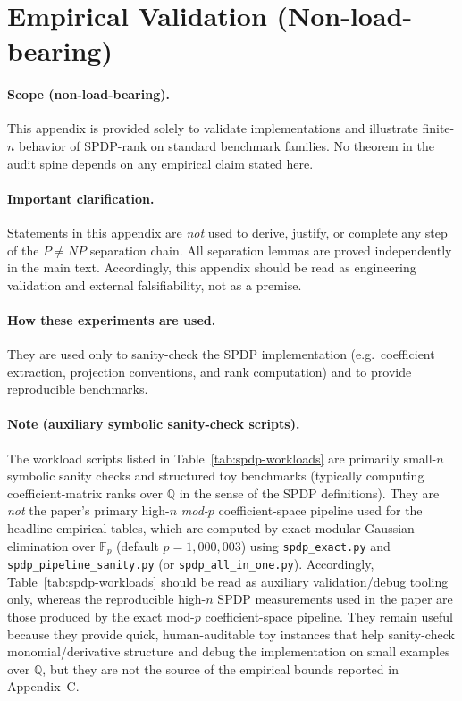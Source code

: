 \documentclass[12pt]{article}
\theoremstyle{definition}
\theoremstyle{definition}
\theoremstyle{remark}
\theoremstyle{remark}
\begin{document}
\section{Empirical Validation (Non-load-bearing)}
\label{sec:empirical}
\label{app:empirical-validation}
\FloatBarrier  %

\paragraph{Scope (non-load-bearing).}
This appendix is provided solely to validate implementations and illustrate finite-$n$
behavior of SPDP-rank on standard benchmark families. No theorem in the audit spine
depends on any empirical claim stated here.

\paragraph{Important clarification.}
Statements in this appendix are \emph{not} used to derive, justify, or complete any step of the
$P\neq NP$ separation chain. All separation lemmas are proved independently in the main text.
Accordingly, this appendix should be read as engineering validation and external falsifiability,
not as a premise.

\paragraph{How these experiments are used.}
They are used only to sanity-check the SPDP implementation (e.g.\ coefficient extraction,
projection conventions, and rank computation) and to provide reproducible benchmarks.

\paragraph{Note (auxiliary symbolic sanity-check scripts).}
The workload scripts listed in Table~\ref{tab:spdp-workloads} are primarily small-$n$ symbolic
sanity checks and structured toy benchmarks (typically computing coefficient-matrix ranks over
$\mathbb{Q}$ in the sense of the SPDP definitions). They are \emph{not} the paper's primary
high-$n$ \emph{mod-$p$} coefficient-space pipeline used for the headline empirical tables, which
are computed by exact modular Gaussian elimination over $\mathbb{F}_p$ (default $p=1{,}000{,}003$)
using \texttt{spdp\_exact.py} and \texttt{spdp\_pipeline\_sanity.py} (or \texttt{spdp\_all\_in\_one.py}).
Accordingly, Table~\ref{tab:spdp-workloads} should be read as auxiliary validation/debug tooling only, whereas the reproducible high-$n$ SPDP measurements used in the paper are those produced by the exact mod-$p$ coefficient-space pipeline.
They remain useful because they provide quick, human-auditable toy instances that help sanity-check monomial/derivative structure and debug the implementation on small examples over $\mathbb{Q}$, but they are not the source of the empirical bounds reported in Appendix~C.
\end{document}
